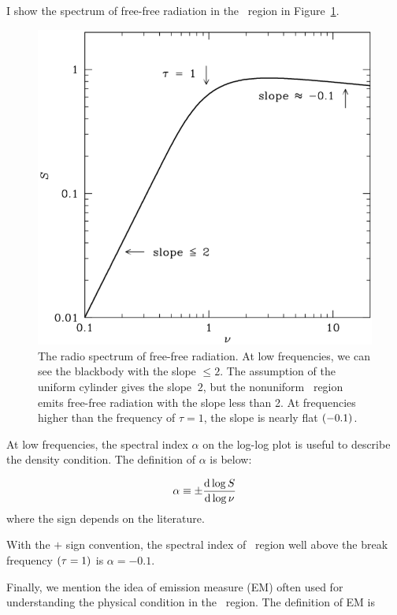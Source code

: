 I show the spectrum of free-free radiation in the \ih~region in Figure~\ref{fig:nrao_radio4n8}.

\begin{figure}[htbp]
	\centering
	\includegraphics[width=.8\linewidth]{Chapter_2/Figures/NRAO_radio4n8.png}
    \caption[The spectrum of free-free radiation]{\label{fig:nrao_radio4n8}
        The radio spectrum of free-free radiation.
        At low frequencies, we can see the blackbody with the slope $\leq 2$.
        The assumption of the uniform cylinder gives the slope $~2$, but the nonuniform \ih~region emits free-free radiation with the slope less than 2.
        At frequencies higher than the frequency of $\tau=1$, the slope is nearly flat $\left(-0.1\right)$.
    }
\end{figure}

At low frequencies, the spectral index $\alpha$ on the log-log plot is useful to describe the density condition.
The definition of $\alpha$ is below:

\begin{equation}\label{eq:essential_radio4n55}
    \alpha \equiv \pm \frac{\mathrm{d} \log S}{\mathrm{d} \log \nu}
\end{equation}
where the sign depends on the literature.

With the $+$ sign convention, the spectral index of \ih~region well above the break frequency $\left(\tau=1\right)$ is $\alpha=-0.1$.\\ \vspace{0.2cm}

Finally, we mention the idea of emission measure (EM) often used for understanding the physical condition in the \ih~region.
The definition of EM is


